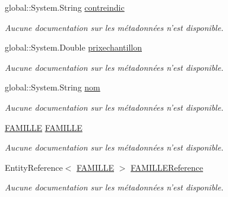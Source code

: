\begin{DoxyCompactItemize}
global\-::\-System.\-String \hyperlink{class_model_1_1_m_e_d_i_c_a_m_e_n_t_adfdf391b99b65867478accf4a5bb6453}{contreindic}
\begin{DoxyCompactList}\small\item\em Aucune documentation sur les métadonnées n'est disponible. \end{DoxyCompactList}\item 
global\-::\-System.\-Double \hyperlink{class_model_1_1_m_e_d_i_c_a_m_e_n_t_a58b900226ac1992ee6b3f996c667e51a}{prixechantillon}
\begin{DoxyCompactList}\small\item\em Aucune documentation sur les métadonnées n'est disponible. \end{DoxyCompactList}\item 
global\-::\-System.\-String \hyperlink{class_model_1_1_m_e_d_i_c_a_m_e_n_t_aac099e9240dac2de02bab20ac675d74b}{nom}
\begin{DoxyCompactList}\small\item\em Aucune documentation sur les métadonnées n'est disponible. \end{DoxyCompactList}\item 
\hyperlink{class_model_1_1_f_a_m_i_l_l_e}{F\-A\-M\-I\-L\-L\-E} \hyperlink{class_model_1_1_m_e_d_i_c_a_m_e_n_t_aaaa915cc1d5a5956f312da4191f30757}{F\-A\-M\-I\-L\-L\-E}
\begin{DoxyCompactList}\small\item\em Aucune documentation sur les métadonnées n'est disponible. \end{DoxyCompactList}\item 
Entity\-Reference$<$ \hyperlink{class_model_1_1_f_a_m_i_l_l_e}{F\-A\-M\-I\-L\-L\-E} $>$ \hyperlink{class_model_1_1_m_e_d_i_c_a_m_e_n_t_a9b87fe7d7a3f5819c14257b5b3fb2cb5}{F\-A\-M\-I\-L\-L\-E\-Reference}
\begin{DoxyCompactList}\small\item\em Aucune documentation sur les métadonnées n'est disponible. \end{DoxyCompactList}\item 

\end{DoxyCompactItemize}
